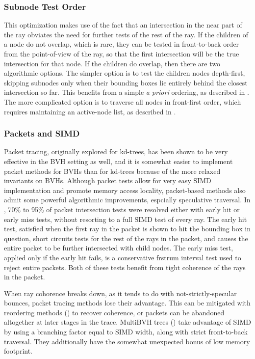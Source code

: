 \documentclass[twocolumn]{article}
\begin{document}
\subsubsection{Subnode Test Order}

This optimization makes use of the fact that an intersection in the near part of the ray obviates the need for further tests of the rest of the ray.  If the children of a node do not overlap, which is rare, they can be tested in front-to-back order from the point-of-view of the ray, so that the first intersection will be the true intersection for that node.  If the children do overlap, then there are two algorithmic options.  The simpler option is to test the children nodes depth-first, skipping subnodes only when their bounding boxes lie entirely behind the closest intersection so far.  This benefits from a simple {\it a priori} ordering, as described in \cite{Wald07}.  The more complicated option is to traverse all nodes in front-first order, which requires maintaining an active-node list, as described in \cite{Wald08}. 

\subsubsection{Packets and SIMD}

Packet tracing, originally explored for kd-trees, has been shown to be very effective in the BVH setting as well, and it is somewhat easier to implement packet methods for BVHs than for kd-trees because of the more relaxed invariants on BVHs.  Although packet tests allow for very easy SIMD implementation and promote memory access locality, packet-based methods also admit some powerful algorithmic improvements, espcially speculative traversal.  In \cite{Wald07}, 70\% to 95\% of packet intersection tests were resolved either with early hit or early miss tests, without resorting to a full SIMD test of every ray.  The early hit test, satisfied when the first ray in the packet is shown to hit the bounding box in question, short circuits tests for the rest of the rays in the packet, and causes the entire packet to be further intersected with child nodes.  The early miss test, applied only if the early hit fails, is a conservative frstrum interval test used to reject entire packets. Both of these tests benefit from tight coherence of the rays in the packet.  

When ray cohorence breaks down, as it tends to do with not-strictly-specular bounces, packet tracing methods lose their advantage.  This can be mitigated with reordering methods (\cite{Boulos08}) to recover coherence, or packets can be abandoned altogether at later stages in the trace.  MultiBVH trees (\cite{Wald08}) take advantage of SIMD by using a branching factor equal to SIMD width, along with strict front-to-back traversal.  They additionally have the somewhat unexpected bonus of low memory footprint.
\end{document}

